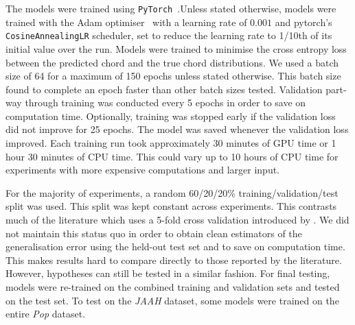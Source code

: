 The models were trained using \texttt{PyTorch}~\citep{pytorch}.Unless stated otherwise, models were trained with the Adam optimiser~\citep{adam} with a learning rate of $0.001$ and pytorch's \texttt{CosineAnnealingLR} scheduler, set to reduce the learning rate to 1/10th of its initial value over the run. Models were trained to minimise the cross entropy loss between the predicted chord and the true chord distributions. We used a batch size of 64 for a maximum of 150 epochs unless stated otherwise. This batch size found to complete an epoch faster than other batch sizes tested. Validation part-way through training was conducted every 5 epochs in order to save on computation time. Optionally, training was stopped early if the validation loss did not improve for 25 epochs. The model was saved whenever the validation loss improved. Each training run took approximately 30 minutes of GPU time or 1 hour 30 minutes of CPU time. This could vary up to 10 hours of CPU time for experiments with more expensive computations and larger input.

For the majority of experiments, a random 60/20/20\% training/validation/test split was used. This split was kept constant across experiments. This contrasts much of the literature which uses a 5-fold cross validation introduced by \citet{FourTimelyInsights}. We did not maintain this status quo in order to obtain clean estimators of the generalisation error using the held-out test set and to save on computation time. This makes results hard to compare directly to those reported by the literature. However, hypotheses can still be tested in a similar fashion. For final testing, models were re-trained on the combined training and validation sets and tested on the test set. To test on the \emph{JAAH} dataset, some models were trained on the entire \emph{Pop} dataset.